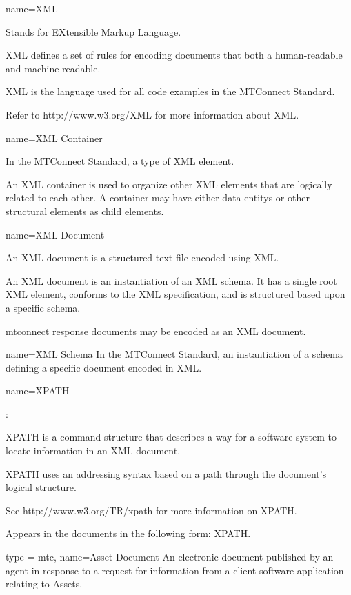 {
  name={XML}
}
{
	Stands for EXtensible Markup Language. 

	XML defines a set of rules for encoding documents that both a human-readable and machine-readable.

	XML is the language used for all code examples in the MTConnect Standard.

	Refer to http://www.w3.org/XML for more information about XML.
}


{
  name={XML Container}
}
{
	In the MTConnect Standard, a type of XML element.

	An XML container is used to organize other XML elements that are logically related to each other.   A container may have either \glspl{data entity} or other \glspl{structural element} as \glspl{child element}.
}


{
  name={XML Document}
}
{
	An XML document is a structured text file encoded using XML.

	An XML document is an instantiation of an XML schema.  It has a single root XML element, conforms to the XML specification, and is structured based upon a specific schema.

	\glspl{mtconnect response document} may be encoded as an XML document.
}


{
  name={XML Schema}
}
{
	In the MTConnect Standard, an instantiation of a schema defining a specific document encoded in XML.
}


{
  name={XPATH}
}
{
	:

	XPATH is a command structure that describes a way for a software system to locate information in an XML document.  

	XPATH uses an addressing syntax based on a path through the document's logical structure. 

	See http://www.w3.org/TR/xpath for more information on XPATH.

	Appears in the documents in the following form: XPATH.
}



{
  type = mtc,
  name={Asset Document}
}
{
	An electronic document published by an \gls{agent} in response to a \gls{request} for information from a client software application relating to Assets.
}




